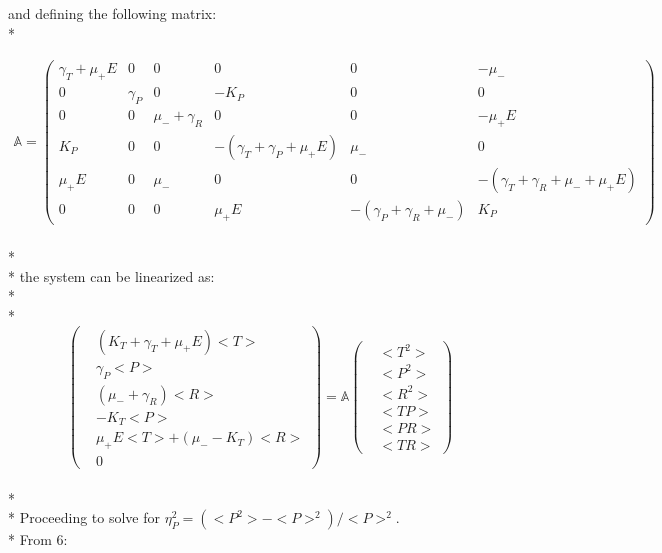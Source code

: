 \documentclass{article}
\begin{document}
and defining the following matrix:
\\*

\begin{align*}
\!\!\!\!\!\!\!\!\!\!\!\!\!\!\!\!\!\mathbb{A} =\begin{pmatrix}
          \gamma_T + \mu_+E    &    0     &    0               &    0                            &    0                            & -\mu_-\\
                            0  & \gamma_P &    0               &  -K_P                           &    0                            &    0\\
                            0  &    0     &  \mu_- + \gamma_R  &    0                            &    0                            &   -\mu_+E\\
                          K_P  &    0     &    0               & -(\gamma_T + \gamma_P + \mu_+E) &  \mu_-                          & 0\\
                        \mu_+E &    0     &    \mu_-           &    0                            &    0                            & -(\gamma_T + \gamma_R + \mu_- + \mu_+E)\\
                            0  &    0     &    0               &    \mu_+E                       &  -(\gamma_P + \gamma_R + \mu_-) & K_P
    \end{pmatrix}
\end{align*}
\\*
\\*
the system can be linearized as:
\\*
\\*
\begin{equation}
    \begin{pmatrix}
        &(K_T + \gamma_T + \mu_+E)<T>\\
        &\gamma_P<P>\\
        &(\mu_- + \gamma_R)<R>\\
        &-K_T<P>\\
        &\mu_+E<T> + (\mu_- - K_T)<R>\\
        &0
    \end{pmatrix}
    = \mathbb{A}
    \begin{pmatrix}
        &<T^2>\\
        &<P^2>\\
        &<R^2>\\
        &<TP> \\
        &<PR> \\
        &<TR>
    \end{pmatrix}
\end{equation}
\\*
\\*
Proceeding to solve for $\eta_P^2=(<P^2> - <P>^2)/<P>^2$.
\\*
From 6:
\end{document}
